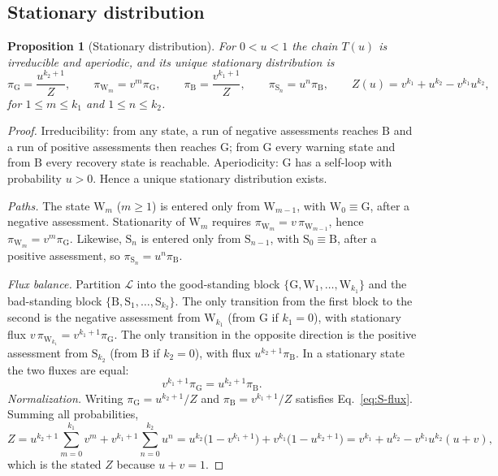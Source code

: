 \documentclass[fleqn,10pt]{article}
\theoremstyle{plain}
\newtheorem{proposition}{Proposition}
\theoremstyle{remark}
\newcommand{\G}{\mathrm G}
\newcommand{\B}{\mathrm B}
\newcommand{\W}{\mathrm W}
\renewcommand{\S}{\mathrm S}
\begin{document}
\subsection{Stationary distribution}
\begin{proposition}[Stationary distribution]\label{prop:stationary}
For $0<u<1$ the chain $T(u)$ is irreducible and aperiodic, and its unique
stationary distribution is
\begin{equation}
\pi_\G=\frac{u^{k_2+1}}{Z},\qquad
\pi_{\W_m}=v^m\pi_\G,\qquad
\pi_\B=\frac{v^{k_1+1}}{Z},\qquad
\pi_{\S_n}=u^n\pi_\B,\qquad
Z(u)=v^{k_1}+u^{k_2}-v^{k_1}u^{k_2},
\label{eq:S-stationary}
\end{equation}
for $1\le m\le k_1$ and $1\le n\le k_2$.
\end{proposition}
\begin{proof}
Irreducibility: from any state, a run of negative assessments reaches $\B$ and a
run of positive assessments then reaches $\G$; from $\G$ every warning state and
from $\B$ every recovery state is reachable. Aperiodicity: $\G$ has a self-loop
with probability $u>0$. Hence a unique stationary distribution exists.

\textit{Paths.} The state $\W_m$ ($m\ge1$) is entered only from $\W_{m-1}$, with
$\W_0\equiv\G$, after a negative assessment. Stationarity of $\W_m$ requires
$\pi_{\W_m}=v\,\pi_{\W_{m-1}}$, hence $\pi_{\W_m}=v^m\pi_\G$. Likewise, $\S_n$ is
entered only from $\S_{n-1}$, with $\S_0\equiv\B$, after a positive assessment,
so $\pi_{\S_n}=u^n\pi_\B$.

\textit{Flux balance.} Partition $\mathcal L$ into the good-standing block
$\{\G,\W_1,\dots,\W_{k_1}\}$ and the bad-standing block
$\{\B,\S_1,\dots,\S_{k_2}\}$. The only transition from the first block to the
second is the negative assessment from $\W_{k_1}$ (from $\G$ if $k_1=0$), with
stationary flux $v\,\pi_{\W_{k_1}}=v^{k_1+1}\pi_\G$. The only transition in the
opposite direction is the positive assessment from $\S_{k_2}$ (from $\B$ if
$k_2=0$), with flux $u^{k_2+1}\pi_\B$. In a stationary state the two fluxes are
equal:
\begin{equation}
v^{k_1+1}\pi_\G=u^{k_2+1}\pi_\B .
\label{eq:S-flux}
\end{equation}
\textit{Normalization.} Writing $\pi_\G=u^{k_2+1}/Z$ and $\pi_\B=v^{k_1+1}/Z$
satisfies Eq.~\eqref{eq:S-flux}. Summing all probabilities,
\[
Z=u^{k_2+1}\sum_{m=0}^{k_1}v^m+v^{k_1+1}\sum_{n=0}^{k_2}u^n
=u^{k_2}\bigl(1-v^{k_1+1}\bigr)+v^{k_1}\bigl(1-u^{k_2+1}\bigr)
=v^{k_1}+u^{k_2}-v^{k_1}u^{k_2}(u+v),
\]
which is the stated $Z$ because $u+v=1$.
\end{proof}
\end{document}
